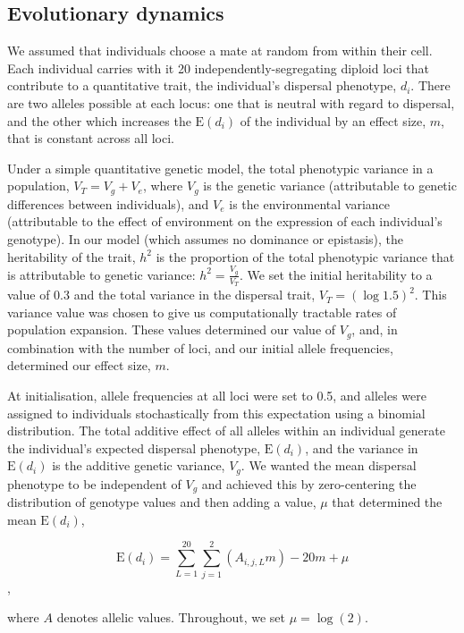 \documentclass{article}
\begin{document}
\subsection{Evolutionary dynamics}

We assumed that individuals choose a mate at random from within their cell. Each
individual carries with it 20 independently-segregating diploid loci that contribute to a quantitative trait, the individual's dispersal phenotype, $d_i$.  There are two alleles possible at each locus: one that is neutral with
regard to dispersal, and the other which increases the \(\text{E}(d_i)\)
of the individual by an effect size, $m$, that is constant across all
loci. 

Under a simple quantitative genetic model, the total phenotypic variance in a population, $V_T=V_g + V_e$, where $V_g$ is the genetic variance (attributable to genetic differences between individuals), and $V_e$ is the environmental variance (attributable to the effect of environment on the expression of each individual's genotype).  In our model (which assumes no dominance or epistasis), the heritability of the trait, $h^2$ is the proportion of the total phenotypic variance that is attributable to genetic variance: $h^2=\frac{V_g}{V_T}$.  We set the initial heritability to a value of 0.3 \citep[a common value for real traits, see][]{Roff1997} and the total variance in the dispersal trait, $V_T=(\log{1.5})^2$.  This variance value was chosen to give us computationally tractable rates of population expansion. These values determined our value of $V_g$, and, in combination with the number of loci, and our initial allele frequencies, determined our effect size, $m$.

At initialisation, allele frequencies at all loci were set to 0.5, and alleles were assigned to individuals stochastically from this expectation using a binomial distribution. The
total additive effect of all alleles within an individual generate the
individual's expected dispersal phenotype, \(\text{E}(d_i)\), and the variance in \(\text{E}(d_i)\) is the additive genetic variance, $V_g$.  We wanted the mean dispersal phenotype to be independent of $V_g$ and achieved this by zero-centering the distribution of genotype values and then adding a value, $\mu$ that determined the mean \(\text{E}(d_i)\),

\[ \text{E}(d_i)=\sum_{L=1}^{20}\sum_{j=1}^{2}(A_{i,j,L}m)-20m+\mu\],

where $A$ denotes allelic values.  Throughout, we set $\mu=\log(2)$.
\end{document}
